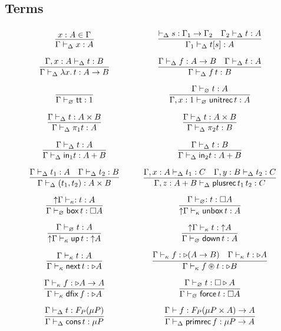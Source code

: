 \subsection*{Terms}

\[\arraycolsep=15pt\def\arraystretch{2.8}
\begin{array}{cc}
\infer{\Gamma \vdash_{\Delta} x : A}{x : A \in \Gamma}
&
\infer{\Gamma_1 \vdash_{\Delta} t[s] : A}{\vdash_{\Delta} s :  \Gamma_1 \to \Gamma_2 & \Gamma_2 \vdash_{\Delta} t : A}
\\
\infer{\Gamma \vdash_{\Delta} \lambda x.\, t : A \to B}{\Gamma , x : A \vdash_{\Delta} t : B} 
&
\infer{\Gamma \vdash_{\Delta} f\,t : B}{\Gamma \vdash_{\Delta} f : A \to B & \Gamma \vdash_{\Delta} t : A}
\\
\infer{\Gamma \vdash_{\varnothing} {\mathsf{tt}} : 1}{}
&
\infer{\Gamma , x : 1 \vdash_{\varnothing} \mathsf{unitrec}\,t : A}{
\Gamma \vdash_{\varnothing} t : A}
\\
\infer{\Gamma \vdash_{\Delta} \pi_1 t : A}{\Gamma \vdash_{\Delta} t : A \times B}
&
\infer{\Gamma \vdash_{\Delta} \pi_2 t : B}{\Gamma \vdash_{\Delta} t : A \times B}
\\
\infer{\Gamma \vdash_{\Delta} \mathsf{in}_1 t : A + B}{\Gamma \vdash_{\Delta} t : A}
&
\infer{\Gamma \vdash_{\Delta} \mathsf{in}_2 t : A + B}{\Gamma \vdash_{\Delta} t : B}
\\
\infer{\Gamma \vdash_{\Delta} (t_1,t_2) : A \times B}{\Gamma
  \vdash_{\Delta} t_1 : A & \Gamma \vdash_{\Delta} t_2 : B} 
&
\infer{\Gamma,z : A + B \vdash_{\Delta} \mathsf{plusrec} \, t_1\,t_2 : C}{\Gamma,x : A
  \vdash_{\Delta} t_1 : C & \Gamma , y : B \vdash_{\Delta} t_2 : C} 
\\
\infer{\Gamma \vdash_{\varnothing} \boxtm\,t : \square A}{\up \Gamma \vdash_{\kappa} : t : A}
&
\infer{\up \Gamma \vdash_{\kappa} \unboxtm\,t : A}{\Gamma \vdash_{\varnothing} : t : \square A}
\\
\infer{\up \Gamma \vdash_{\kappa} \mathsf{up} \,t : \up A}{\Gamma \vdash_{\varnothing} t : A}
&
\infer {\Gamma \vdash_{\varnothing} \mathsf{down}\,t : A}{\up\Gamma
  \vdash_{\kappa} t : \up A}
\\
\infer{\Gamma \vdash_{\kappa} \next\,t : \later A}{\Gamma \vdash_{\kappa} t : A} 
&
\infer{\Gamma \vdash_{\kappa} f \circledast t : \later B}{\Gamma \vdash_{\kappa} f : \later (A \to B) & \Gamma \vdash_{\kappa} t : \later A}
\\
\infer{\Gamma \vdash_{\kappa} \fix \,f : \later A}{\Gamma \vdash_{\kappa} f : \later A \to A}
&
\infer{\Gamma \vdash_{\varnothing} \force\,t : \square A}{\Gamma \vdash_{\varnothing} t : \square \later A}
\\
\infer{\Gamma \vdash_{\Delta} \cons \, t : \mu P}{
\Gamma \vdash_{\Delta} t : F_P(\mu P)}
&
\infer{\Gamma \vdash_{\Delta} \primrec \, f : \mu P \to A}{%
\Gamma \vdash f : F_P(\mu P \times A) \to A}
\end{array}
\]

